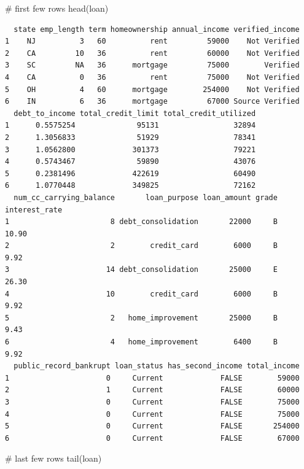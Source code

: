 \documentclass[
  letterpaper,
  DIV=11,
  numbers=noendperiod]{scrreprt}
\newenvironment{Shaded}{\begin{snugshade}}{\end{snugshade}}
\newcommand{\CommentTok}[1]{\textcolor[rgb]{0.37,0.37,0.37}{#1}}
\newcommand{\FunctionTok}[1]{\textcolor[rgb]{0.28,0.35,0.67}{#1}}
\newcommand{\NormalTok}[1]{\textcolor[rgb]{0.00,0.23,0.31}{#1}}
\begin{document}
\begin{tcolorbox}
\begin{Shaded}
\begin{Highlighting}[]
\CommentTok{\# first few rows}
\FunctionTok{head}\NormalTok{(loan)}
\end{Highlighting}
\end{Shaded}

\begin{verbatim}
  state emp_length term homeownership annual_income verified_income
1    NJ          3   60          rent         59000    Not Verified
2    CA         10   36          rent         60000    Not Verified
3    SC         NA   36      mortgage         75000        Verified
4    CA          0   36          rent         75000    Not Verified
5    OH          4   60      mortgage        254000    Not Verified
6    IN          6   36      mortgage         67000 Source Verified
  debt_to_income total_credit_limit total_credit_utilized
1      0.5575254              95131                 32894
2      1.3056833              51929                 78341
3      1.0562800             301373                 79221
4      0.5743467              59890                 43076
5      0.2381496             422619                 60490
6      1.0770448             349825                 72162
  num_cc_carrying_balance       loan_purpose loan_amount grade interest_rate
1                       8 debt_consolidation       22000     B         10.90
2                       2        credit_card        6000     B          9.92
3                      14 debt_consolidation       25000     E         26.30
4                      10        credit_card        6000     B          9.92
5                       2   home_improvement       25000     B          9.43
6                       4   home_improvement        6400     B          9.92
  public_record_bankrupt loan_status has_second_income total_income
1                      0     Current             FALSE        59000
2                      1     Current             FALSE        60000
3                      0     Current             FALSE        75000
4                      0     Current             FALSE        75000
5                      0     Current             FALSE       254000
6                      0     Current             FALSE        67000
\end{verbatim}

\begin{Shaded}
\begin{Highlighting}[]
\CommentTok{\# last few rows}
\FunctionTok{tail}\NormalTok{(loan)}
\end{Highlighting}
\end{Shaded}


\end{tcolorbox}
\end{document}

